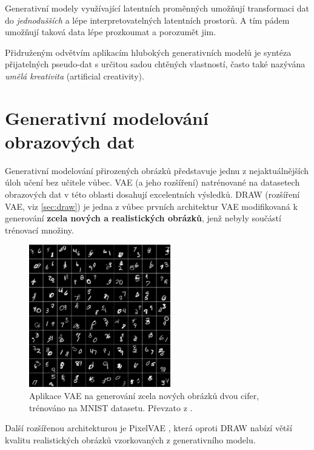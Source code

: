 Generativní modely využívající latentních proměnných umožňují transformaci dat
do \emph{jednodušších} a lépe interpretovatelných latentních prostorů.
A tím pádem umožňují taková data lépe prozkoumat a porozumět jim. \cite{Kingma2019}

Přidruženým odvětvím aplikacím hlubokých generativních modelů je syntéza přijatelných pseudo-dat s určitou sadou chtěných vlastností, často také nazývána \emph{umělá kreativita} (artificial creativity).


\newpage
\section{Generativní modelování obrazových dat}
Generativní modelování přirozených obrázků představuje jednu z nejaktuálnějších úloh učení bez učitele vůbec. \cite{Gulrajani2016}
VAE (a jeho rozšíření) natrénované na datasetech obrazových dat v této oblasti dosahují excelentních výsledků.
DRAW (rozšíření VAE, viz \autoref{sec:draw}) je jedna z vůbec prvních architektur VAE modifikovaná k generování \textbf{zcela nových a realistických obrázků}, jenž nebyly součástí trénovací množiny.
\begin{figure}[H]
    \centering
    \includegraphics[width=0.55\textwidth]{figures/applications/mnist_double_digits_gregor.png}
    \caption{Aplikace VAE na generování zcela nových obrázků dvou cifer, trénováno na MNIST datasetu. Převzato z \cite{Gregor2015}.}
    \label{fig:mnist_double_digits_gregor}
\end{figure}

Další rozšířenou architekturou je PixelVAE \cite{Gulrajani2016}, která oproti DRAW nabízí větší kvalitu realistických obrázků vzorkovaných z generativního modelu.

